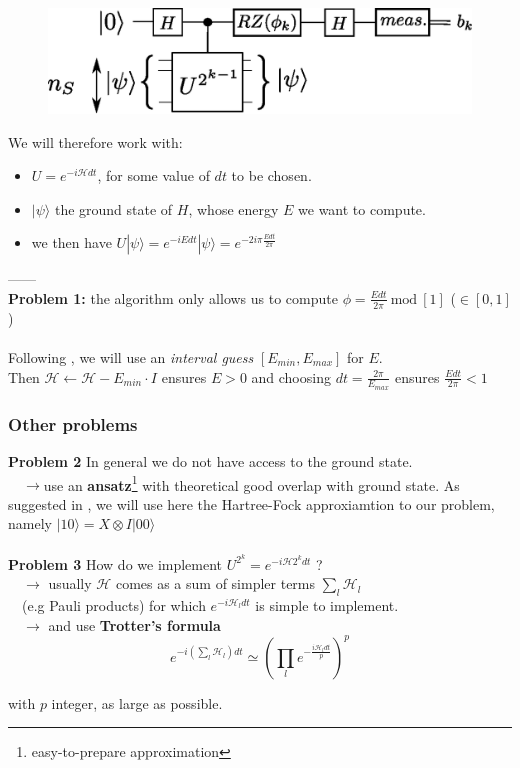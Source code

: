 \documentclass{beamer}
\begin{document}
\begin{frame}

\begin{center}
\begin{figure}
\includegraphics[width=.6\textwidth]{iterative_pea.eps}
\end{figure}
\end{center}

We will therefore work with:
\begin{itemize} 
\item $U=e^{-i\mathcal{H}dt}$, for some value of $dt$ to be chosen.
\item $|\psi\rangle$ the ground state of $H$, whose energy $E$ we want to compute.
\item we then have $U|\psi\rangle = e^{-iEdt}|\psi\rangle= e^{-2i\pi\frac{Edt}{2\pi}}$
\end{itemize}
------\\
\textbf{Problem 1:} the algorithm only allows us to compute $\phi=\frac{Edt}{2\pi}\: \text{mod}\: \left[1\right]$ ($\in \left[0,1\right]$)\\~\\
Following \textcolor{blue}{\cite{whitfield2011simulation}}, we will use an \emph{interval guess} $\left[E_{min},E_{max}\right]$ 
for $E$.\\
Then $\mathcal{H}\leftarrow \mathcal{H}-E_{min}\cdot I$ ensures $E>0$ and choosing $dt=\frac{2\pi}{E_{max}}$ ensures $\frac{Edt}{2\pi}<1$ 

\end{frame}

\begin{frame}
\frametitle{Other problems}
\textbf{Problem 2} In general we do not have access to the ground state.\\$\quad\rightarrow$use an \textbf{ansatz}\footnote{easy-to-prepare approximation} 
with theoretical good overlap with ground state. As suggested in \textcolor{blue}{\cite{o2016scalable}}, we will
use here the Hartree-Fock approxiamtion to our problem, namely $|10\rangle=X\otimes I |00\rangle$\\~\\

\textbf{Problem 3} How do we implement $U^{2^{k}} = e^{-i\mathcal{H}2^{k}dt}$ ?\\
$\quad\rightarrow$ usually $\mathcal{H}$ comes as a sum of simpler terms $\sum_{l} \mathcal{H}_{l}$\\
$\quad$(e.g Pauli products) for which $e^{-i\mathcal{H}_{l}dt}$ is simple to implement.\\
$\quad\rightarrow$ and use \textbf{Trotter's formula} \textcolor{blue}{\cite{whitfield2011simulation}} 
$$ e^{-i\left(\sum_{l}\mathcal{H}_{l}\right)dt} \simeq \left(\prod_{l} e^{-\frac{i\mathcal{H}_{l}dt}{p} }\right)^{p} $$ 

with $p$ integer, as large as possible.

\end{frame}
\end{document}

